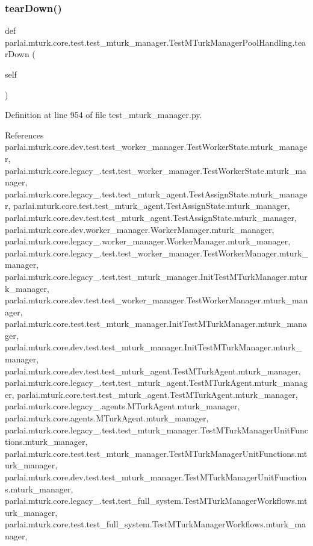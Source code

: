 \subsubsection{\texorpdfstring{tear\+Down()}{tearDown()}}
{\footnotesize\ttfamily def parlai.\+mturk.\+core.\+test.\+test\+\_\+mturk\+\_\+manager.\+Test\+M\+Turk\+Manager\+Pool\+Handling.\+tear\+Down (\begin{DoxyParamCaption}\item[{}]{self }\end{DoxyParamCaption})}



Definition at line 954 of file test\+\_\+mturk\+\_\+manager.\+py.



References parlai.\+mturk.\+core.\+dev.\+test.\+test\+\_\+worker\+\_\+manager.\+Test\+Worker\+State.\+mturk\+\_\+manager, parlai.\+mturk.\+core.\+legacy\+\_.\+test.\+test\+\_\+worker\+\_\+manager.\+Test\+Worker\+State.\+mturk\+\_\+manager, parlai.\+mturk.\+core.\+legacy\+\_.\+test.\+test\+\_\+mturk\+\_\+agent.\+Test\+Assign\+State.\+mturk\+\_\+manager, parlai.\+mturk.\+core.\+test.\+test\+\_\+mturk\+\_\+agent.\+Test\+Assign\+State.\+mturk\+\_\+manager, parlai.\+mturk.\+core.\+dev.\+test.\+test\+\_\+mturk\+\_\+agent.\+Test\+Assign\+State.\+mturk\+\_\+manager, parlai.\+mturk.\+core.\+dev.\+worker\+\_\+manager.\+Worker\+Manager.\+mturk\+\_\+manager, parlai.\+mturk.\+core.\+legacy\+\_.\+worker\+\_\+manager.\+Worker\+Manager.\+mturk\+\_\+manager, parlai.\+mturk.\+core.\+legacy\+\_.\+test.\+test\+\_\+worker\+\_\+manager.\+Test\+Worker\+Manager.\+mturk\+\_\+manager, parlai.\+mturk.\+core.\+legacy\+\_.\+test.\+test\+\_\+mturk\+\_\+manager.\+Init\+Test\+M\+Turk\+Manager.\+mturk\+\_\+manager, parlai.\+mturk.\+core.\+dev.\+test.\+test\+\_\+worker\+\_\+manager.\+Test\+Worker\+Manager.\+mturk\+\_\+manager, parlai.\+mturk.\+core.\+test.\+test\+\_\+mturk\+\_\+manager.\+Init\+Test\+M\+Turk\+Manager.\+mturk\+\_\+manager, parlai.\+mturk.\+core.\+dev.\+test.\+test\+\_\+mturk\+\_\+manager.\+Init\+Test\+M\+Turk\+Manager.\+mturk\+\_\+manager, parlai.\+mturk.\+core.\+dev.\+test.\+test\+\_\+mturk\+\_\+agent.\+Test\+M\+Turk\+Agent.\+mturk\+\_\+manager, parlai.\+mturk.\+core.\+legacy\+\_.\+test.\+test\+\_\+mturk\+\_\+agent.\+Test\+M\+Turk\+Agent.\+mturk\+\_\+manager, parlai.\+mturk.\+core.\+test.\+test\+\_\+mturk\+\_\+agent.\+Test\+M\+Turk\+Agent.\+mturk\+\_\+manager, parlai.\+mturk.\+core.\+legacy\+\_.\+agents.\+M\+Turk\+Agent.\+mturk\+\_\+manager, parlai.\+mturk.\+core.\+agents.\+M\+Turk\+Agent.\+mturk\+\_\+manager, parlai.\+mturk.\+core.\+legacy\+\_.\+test.\+test\+\_\+mturk\+\_\+manager.\+Test\+M\+Turk\+Manager\+Unit\+Functions.\+mturk\+\_\+manager, parlai.\+mturk.\+core.\+test.\+test\+\_\+mturk\+\_\+manager.\+Test\+M\+Turk\+Manager\+Unit\+Functions.\+mturk\+\_\+manager, parlai.\+mturk.\+core.\+dev.\+test.\+test\+\_\+mturk\+\_\+manager.\+Test\+M\+Turk\+Manager\+Unit\+Functions.\+mturk\+\_\+manager, parlai.\+mturk.\+core.\+legacy\+\_.\+test.\+test\+\_\+full\+\_\+system.\+Test\+M\+Turk\+Manager\+Workflows.\+mturk\+\_\+manager, parlai.\+mturk.\+core.\+test.\+test\+\_\+full\+\_\+system.\+Test\+M\+Turk\+Manager\+Workflows.\+mturk\+\_\+manager, 